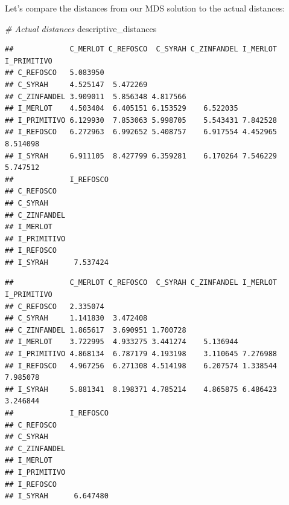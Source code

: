 \documentclass[
]{book}
\newenvironment{Shaded}{\begin{snugshade}}{\end{snugshade}}
\newcommand{\AttributeTok}[1]{\textcolor[rgb]{0.13,0.29,0.53}{#1}}
\newcommand{\CommentTok}[1]{\textcolor[rgb]{0.56,0.35,0.01}{\textit{#1}}}
\newcommand{\FunctionTok}[1]{\textcolor[rgb]{0.13,0.29,0.53}{\textbf{#1}}}
\newcommand{\NormalTok}[1]{#1}
\newcommand{\SpecialCharTok}[1]{\textcolor[rgb]{0.81,0.36,0.00}{\textbf{#1}}}
\newcommand{\StringTok}[1]{\textcolor[rgb]{0.31,0.60,0.02}{#1}}
\begin{document}
Let's compare the distances from our MDS solution to the actual distances:

\begin{Shaded}
\begin{Highlighting}[]
\CommentTok{\# Actual distances}
\NormalTok{descriptive\_distances}
\end{Highlighting}
\end{Shaded}

\begin{verbatim}
##             C_MERLOT C_REFOSCO  C_SYRAH C_ZINFANDEL I_MERLOT I_PRIMITIVO
## C_REFOSCO   5.083950                                                    
## C_SYRAH     4.525147  5.472269                                          
## C_ZINFANDEL 3.909011  5.856348 4.817566                                 
## I_MERLOT    4.503404  6.405151 6.153529    6.522035                     
## I_PRIMITIVO 6.129930  7.853063 5.998705    5.543431 7.842528            
## I_REFOSCO   6.272963  6.992652 5.408757    6.917554 4.452965    8.514098
## I_SYRAH     6.911105  8.427799 6.359281    6.170264 7.546229    5.747512
##             I_REFOSCO
## C_REFOSCO            
## C_SYRAH              
## C_ZINFANDEL          
## I_MERLOT             
## I_PRIMITIVO          
## I_REFOSCO            
## I_SYRAH      7.537424
\end{verbatim}

\begin{Shaded}
\end{Shaded}

\begin{verbatim}
##             C_MERLOT C_REFOSCO  C_SYRAH C_ZINFANDEL I_MERLOT I_PRIMITIVO
## C_REFOSCO   2.335074                                                    
## C_SYRAH     1.141830  3.472408                                          
## C_ZINFANDEL 1.865617  3.690951 1.700728                                 
## I_MERLOT    3.722995  4.933275 3.441274    5.136944                     
## I_PRIMITIVO 4.868134  6.787179 4.193198    3.110645 7.276988            
## I_REFOSCO   4.967256  6.271308 4.514198    6.207574 1.338544    7.985078
## I_SYRAH     5.881341  8.198371 4.785214    4.865875 6.486423    3.246844
##             I_REFOSCO
## C_REFOSCO            
## C_SYRAH              
## C_ZINFANDEL          
## I_MERLOT             
## I_PRIMITIVO          
## I_REFOSCO            
## I_SYRAH      6.647480
\end{verbatim}
\end{document}
